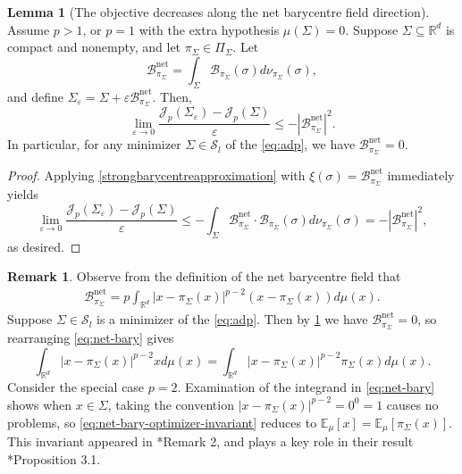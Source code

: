 \documentclass[preprint, reqno]{amsart}
\renewcommand{\epsilon}{\varepsilon}
\theoremstyle{definition}
\newtheorem{lemma}[definition]{Lemma}
\newtheorem{remark}[definition]{Remark}
\numberwithin{equation}{section}
\begin{document}
\begin{lemma}[{The objective decreases along the net
    barycentre field direction}]
  \label{pmeanlemma}
  Assume $p > 1$, or $p=1$ with the extra hypothesis $\mu(\Sigma)
  = 0$. Suppose $\Sigma \subseteq \mathbb{R}^d$ is compact and
  nonempty, and let $\pi_{\Sigma}\in \Pi_{\Sigma}$. Let
  \[
    \mathcal{B}^{\mathrm{net}}_{\pi_{\Sigma}} =
    \int_{\Sigma}\mathcal{B}_{\pi_{\Sigma}}(\sigma)
    d\nu_{\pi_{\Sigma}}(\sigma),
  \]
  and define $\Sigma_{\epsilon} = \Sigma + \epsilon
  \mathcal{B}^{\mathrm{net}}_{\pi_{\Sigma}}$. Then,
  \[
    \lim_{\epsilon \to 0} \frac{\mathscr{J}_p(\Sigma_{\epsilon})
      -\mathscr{J}_p(\Sigma)}{\epsilon} \leq
    -|\mathcal{B}^{\mathrm{net}}_{\pi_{\Sigma}}|^2.
  \]
  In particular, for any minimizer $\Sigma \in \mathcal{S}_l$ of the
  \eqref{eq:adp}, we have $\mathcal{B}^{\mathrm{net}}_{\pi_{\Sigma}} =
  0$.
\end{lemma}

\begin{proof}
  Applying \cref{strongbarycentreapproximation} with $\xi(\sigma) =
  \mathcal{B}^{\mathrm{net}}_{\pi_{\Sigma}}$ immediately yields
  \[
    \lim_{\epsilon\to 0} \frac{\mathscr{J}_p(\Sigma_{\epsilon}) -
      \mathscr{J}_p(\Sigma)}{\epsilon} \leq - \int_{\Sigma}
    \mathcal{B}^{\mathrm{net}}_{\pi_{\Sigma}} \cdot
    \mathcal{B}_{\pi_{\Sigma}}(\sigma)d\nu_{\pi_{\Sigma}}(\sigma) = -
    |\mathcal{B}^{\mathrm{net}}_{\pi_{\Sigma}}|^2,
  \]
  as desired.
\end{proof}
\begin{remark}\label{rm:net-bary}
  Observe from the definition of the net barycentre field that
  \begin{align}\label{eq:net-bary}
    \mathcal{B}^{\mathrm{net}}_{\pi_{\Sigma}} =
    p \int_{\mathbb{R}^d}|x - \pi_{\Sigma}(x)|^{p-2}(x -
    \pi_{\Sigma}(x)) d \mu(x).
  \end{align}
  Suppose $\Sigma \in \mathcal S_l$ is a minimizer of the
  \eqref{eq:adp}. Then by \cref{pmeanlemma} we have
  $\mathcal{B}_{\pi_{\Sigma}}^{\mathrm{net}} = 0$, so rearranging
  \eqref{eq:net-bary} gives
  \begin{equation}
    \int_{\mathbb R^d} \lvert x - \pi_\Sigma(x) \rvert^{p-2} x d\mu(x)
    = \int_{\mathbb R^d} \lvert x-\pi_\Sigma(x) \rvert^{p-2}
    \pi_\Sigma(x) d\mu(x). \label{eq:net-bary-optimizer-invariant}
  \end{equation}
  Consider the special case $p=2$. Examination of the integrand in
  \eqref{eq:net-bary} shows when $x \in \Sigma$, taking the convention
  $\lvert x - \pi_\Sigma(x) \rvert^{p-2} = 0^0 = 1$ causes no
  problems, so \eqref{eq:net-bary-optimizer-invariant} reduces to
  $\mathbb{E}_\mu[x] = \mathbb{E}_{\mu}[\pi_\Sigma(x)]$. This
  invariant appeared in \cite{Delattre17}*{Remark 2}, and plays a key
  role in their result \cite{Delattre17}*{Proposition 3.1}.
\end{remark}
\end{document}
